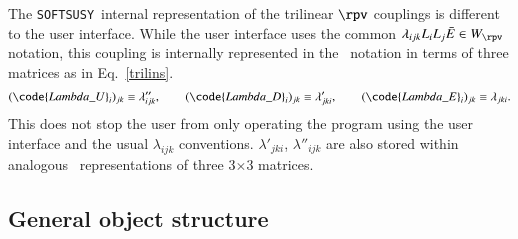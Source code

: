 \documentclass[final,3p,times,pdflatex]{elsarticle}
\def\SOFTSUSY{{\tt SOFTSUSY}}
\begin{document}
The \SOFTSUSY~internal representation of the trilinear $\rpv$ couplings
is different to the user interface. While the user interface uses the
common $\lambda_{ijk} L_i L_j \bar E \in W_{\rpv}$ notation, this coupling is
internally represented in the \cite{Allanach:2003eb} ~notation in
terms of 
three matrices as in Eq.~\ref{trilins}. 
\begin{equation}
(\code{Lambda\_U}_i)_{jk}\equiv \lambda''_{ijk}, \qquad
(\code{Lambda\_D}_i)_{jk} \equiv \lambda'_{jki}, \qquad
(\code{Lambda\_E}_i)_{jk} \equiv \lambda_{jki}. \label{trilins}
\end{equation}
This does not stop
the user from only operating 
the program using the user interface and the usual $\lambda_{ijk}$ conventions.
$\lambda'_{jki}$, $\lambda''_{ijk}$ are also stored within analogous
~representations of three 3$\times$3 matrices. 

\subsection{General object structure}
\end{document}
